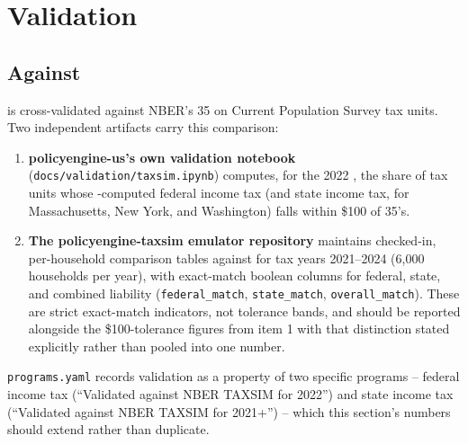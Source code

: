 \section{Validation}
\label{sec:validation}

\subsection{Against \taxsim{}}
\label{sec:validation-taxsim}

\policyengineus{} is cross-validated against NBER's \taxsim{}35 on Current
Population Survey tax units. Two independent artifacts carry this
comparison:

\begin{enumerate}
\item \textbf{policyengine-us's own validation notebook}
(\texttt{docs/validation/taxsim.ipynb}) computes, for the 2022 \cps{}, the
share of tax units whose \policyengineus{}-computed federal income tax (and
state income tax, for Massachusetts, New York, and Washington) falls within
\$100 of \taxsim{}35's. 
\item \textbf{The policyengine-taxsim emulator repository} maintains
checked-in, per-household comparison tables against \taxsim{} for tax years
2021--2024 (6{,}000 households per year), with exact-match boolean columns
for federal, state, and combined liability
(\texttt{federal\_match}, \texttt{state\_match}, \texttt{overall\_match}).
These are strict exact-match indicators, not tolerance bands, and should be
reported alongside the \$100-tolerance figures from item 1 with that
distinction stated explicitly rather than pooled into one number.
\end{enumerate}

\texttt{programs.yaml} records \taxsim{} validation as a property of two
specific programs -- federal income tax (``Validated against NBER TAXSIM for
2022'') and state income tax (``Validated against NBER TAXSIM for
2021+'') -- which this section's numbers should extend rather than
duplicate.

